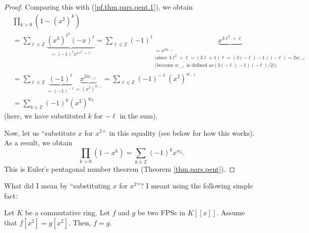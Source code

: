 \begin{proof}
Comparing this with (\ref{pf.thm.pars.pent.1}), we obtain%
\begin{align}
&  \prod_{k>0}\left(  1-\left(  x^{2}\right)  ^{k}\right) \nonumber\\
&  =\sum_{\ell\in\mathbb{Z}}\underbrace{\left(  x^{3}\right)  ^{\ell^{2}%
}\left(  -x\right)  ^{\ell}}_{=\left(  -1\right)  ^{\ell}x^{3\ell^{2}+\ell}%
}=\sum_{\ell\in\mathbb{Z}}\left(  -1\right)  ^{\ell}\underbrace{x^{3\ell
^{2}+\ell}}_{\substack{=x^{2w_{-\ell}}\\\text{(since }3\ell^{2}+\ell=\left(
3\ell+1\right)  \ell=\left(  3\left(  -\ell\right)  -1\right)  \left(
-\ell\right)  =2w_{-\ell}\\\text{(because }w_{-\ell}\text{ is defined as
}\left(  3\left(  -\ell\right)  -1\right)  \left(  -\ell\right)  /2\text{))}%
}}\nonumber\\
&  =\sum_{\ell\in\mathbb{Z}}\underbrace{\left(  -1\right)  ^{\ell}}_{=\left(
-1\right)  ^{-\ell}}\underbrace{x^{2w_{-\ell}}}_{=\left(  x^{2}\right)
^{w_{-\ell}}}=\sum_{\ell\in\mathbb{Z}}\left(  -1\right)  ^{-\ell}\left(
x^{2}\right)  ^{w_{-\ell}}\nonumber\\
&  =\sum_{k\in\mathbb{Z}}\left(  -1\right)  ^{k}\left(  x^{2}\right)  ^{w_{k}}
\label{pf.thm.pars.pent.2}%
\end{align}
(here, we have substituted $k$ for $-\ell$ in the sum).

Now, let us \textquotedblleft substitute $x$ for $x^{2}$\textquotedblright\ in
this equality (see below for how this works). As a result, we obtain%
\[
\prod_{k>0}\left(  1-x^{k}\right)  =\sum_{k\in\mathbb{Z}}\left(  -1\right)
^{k}x^{w_{k}}.
\]
This is Euler's pentagonal number theorem (Theorem \ref{thm.pars.pent}).
\end{proof}

What did I mean by \textquotedblleft substituting $x$ for $x^{2}%
$\textquotedblright? I meant using the following simple fact:

\begin{lemma}
\label{lem.fps.fxx=gxx}Let $K$ be a commutative ring. Let $f$ and $g$ be two
FPSs in $K\left[  \left[  x\right]  \right]  $. Assume that $f\left[
x^{2}\right]  =g\left[  x^{2}\right]  $. Then, $f=g$.
\end{lemma}

